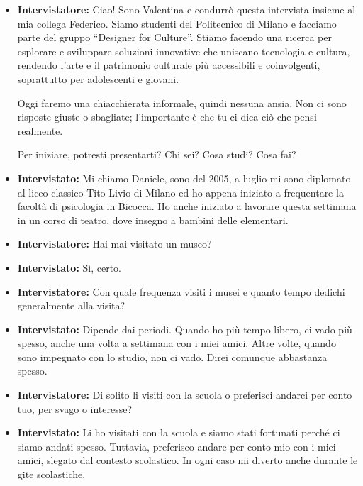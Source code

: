 \documentclass{article}
\begin{document}
\begin{itemize}
    \item \textbf{Intervistatore:} Ciao! Sono Valentina e condurrò questa intervista insieme al mia collega Federico. Siamo studenti del Politecnico di Milano e facciamo parte del gruppo “Designer for Culture”. Stiamo facendo una ricerca per esplorare e sviluppare soluzioni innovative che uniscano tecnologia e cultura, rendendo l’arte e il patrimonio culturale più accessibili e coinvolgenti, soprattutto per adolescenti e giovani.

    Oggi faremo una chiacchierata informale, quindi nessuna ansia. Non ci sono risposte giuste o sbagliate; l’importante è che tu ci dica ciò che pensi realmente.

    Per iniziare, potresti presentarti? Chi sei? Cosa studi? Cosa fai?

    \item \textbf{Intervistato:} Mi chiamo Daniele, sono del 2005, a luglio mi sono diplomato al liceo classico Tito Livio di Milano ed ho appena iniziato  a frequentare la facoltà di psicologia in Bicocca. Ho anche iniziato a lavorare questa settimana in un corso di teatro, dove insegno a bambini delle elementari.

    \item \textbf{Intervistatore:} Hai mai visitato un museo?

    \item \textbf{Intervistato:} Sì, certo.

    \item \textbf{Intervistatore:} Con quale frequenza visiti i musei e quanto tempo dedichi generalmente alla visita?

    \item \textbf{Intervistato:} Dipende dai periodi. Quando ho più tempo libero, ci vado più spesso, anche una volta a settimana con i miei amici. Altre volte, quando sono impegnato con lo studio, non ci vado. Direi comunque abbastanza spesso.

    \item \textbf{Intervistatore:} Di solito li visiti con la scuola o preferisci andarci per conto tuo, per svago o interesse?

    \item \textbf{Intervistato:} Li ho visitati con la scuola e siamo stati fortunati perché ci siamo andati spesso. Tuttavia, preferisco andare per conto mio con i miei amici, slegato dal contesto scolastico. In ogni caso mi diverto anche durante le gite scolastiche.


\end{itemize}
\end{document}
